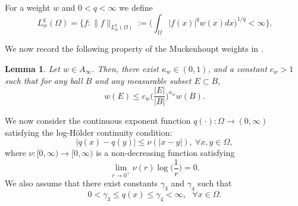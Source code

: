 \documentclass[a4paper,10pt]{amsart}
\newtheorem{lem}[thm]{Lemma}
\newcommand{\f}{\frac}
\newcommand{\Om}{\Omega}
\newcommand{\vc}{\infty}
\begin{document}
For a weight $w$ and $0<q<\vc$ we define
$$
L^q_w(\Om)=\Big\{f: \|f\|_{L^q_w(\Om)}:=\Big(\int_{\Om }|f(x)|^q w(x)dx\Big)^{1/q}<\vc\Big\}.
$$

We now record the following property of the Muckenhoupt weights in \cite{Du}.
\begin{lem}\label{weightedlemma2}
	Let  $w\in A_\vc$. Then, there exist $\kappa_w\in (0,1)$, and a constant $c_w>1$ such that for any ball $B$ and any measurable subset $E\subset B$,
	$$w(E) \leq c_w \Big(\f{|E|}{|B|}\Big)^{\kappa_w}w(B).
	$$
\end{lem}

We now consider the continuous exponent function $q(\cdot): \Om\to (0,\vc)$ satisfying the log-H\"older continuity condition:
\begin{equation}
\label{cond1-qx}|q(x)-q(y)|\leq \nu(|x-y|), \ \forall x,y\in \Om,
\end{equation}
where $\nu:[0,\vc)\to [0,\vc)$ is a non-decreasing function satisfying
\begin{equation}
\label{cond2-qx} \lim_{r\to 0^+}\nu(r)\log\Big(\f{1}{r}\Big)=0.
\end{equation}
We also assume that there exist constants $\gamma_3$ and $\gamma_4$ such that
\begin{equation}
\label{cond3-qx}
0<\gamma_3\leq q(x)\leq \gamma_4<\vc, \ \ \ \forall x\in \Om.
\end{equation}
\end{document}
